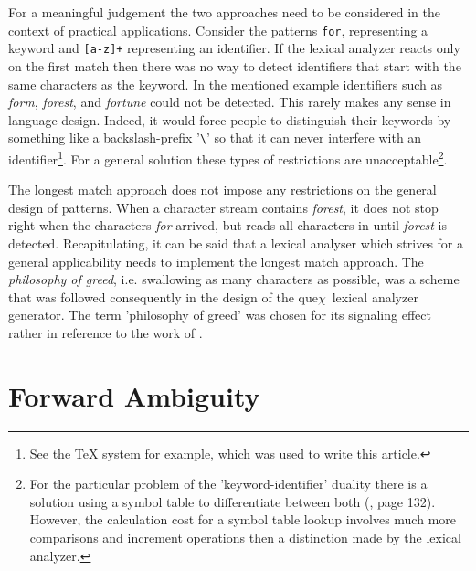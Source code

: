 \documentclass[acmtoplas]{acmtrans2m}
\newcommand{\quex}{que$\chi$}
\begin{document}
For a meaningful judgement the two approaches need to be considered in the
context of practical applications.  Consider the patterns {\tt for},
representing a keyword and \verb|[a-z]+| representing an identifier.
If the lexical analyzer reacts only on the first match then there
was no way to detect identifiers that start with the same
characters as the keyword. In the mentioned example identifiers
such as {\it form}, {\it forest}, and {\it fortune} could not
be detected. This rarely makes any sense in language design.
Indeed, it would force people to distinguish their keywords by
something like a backslash-prefix '\verb|\|' so that it can
never interfere with an identifier\footnote{See the \TeX
system\cite{Knuth:1984} for example, which was used to write this
article.}. For a general solution these types of
restrictions are unacceptable\footnote{For the particular problem
    of the 'keyword-identifier' duality there is a solution using 
a symbol table to differentiate between both (\cite{Aho:2007}, page 132). However,
the calculation cost for a symbol table lookup involves much more comparisons
   and increment operations then a distinction made by the lexical analyzer.}.

The longest match approach does not impose any restrictions on the general
design of patterns.  When a character stream contains {\it forest}, it does not
stop right when the characters {\it for} arrived, but reads all characters in
until {\it forest} is detected. Recapitulating, it can be said that a lexical
analyser which strives for a general applicability needs to implement the
longest match approach.  The {\it philosophy of greed}, i.e. swallowing as many
characters as possible, was a scheme that was followed consequently in the
design of the \quex\ lexical analyzer generator\cite{Schaefer:2007:quex}. The
term 'philosophy of greed' was chosen for its signaling effect rather in
reference to the work of \cite{Beardsley:2007}.

\section{Forward Ambiguity}
\label{sec:forward-ambiguity}
\end{document}
